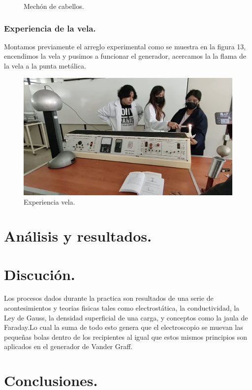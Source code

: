 \documentclass[10pt]{article}
\begin{document}
\begin{multicols}{2}
\begin{figure}[h]
\caption{Mechón de cabellos.}
\end{figure}
\subsubsection{Experiencia de la vela.}
Montamos previamente el arreglo experimental como se muestra en la figura 13, encendimos la vela y pusimos a funcionar el generador, acercamos la la flama de la vela a la punta metálica.

\begin{figure}[h]
\centering
\includegraphics[scale=0.07]{p17}
\caption{Experiencia vela.}
\end{figure}

\section{Análisis y resultados.}

\section{Discución.}
Los procesos dados durante la practica son resultados de una serie de acontesimientos y teorias fisicas tales como electrostática, la conductividad, la Ley de Gauss, la densidad superficial de una carga, y conceptos como la jaula de Faraday.Lo cual la suma de todo esto genera que el electroscopio se muevan las pequeñas bolas dentro de los recipientes al igual que estos mismos principios son aplicados en el generador de Vander Graff. 

\section{Conclusiones.}

\end{multicols}
\end{document}
